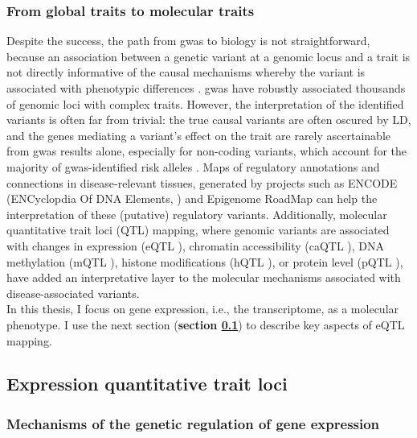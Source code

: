 \subsubsection{From global traits to molecular traits}

Despite the success, the path from \gls{gwas} to biology is not straightforward, because an association between a genetic variant at a genomic locus and a trait is not directly informative of the causal mechanisms whereby the variant is associated with phenotypic differences \cite{visscher201710}. 
\gls{gwas} have robustly associated thousands of genomic loci with complex traits. 
However, the interpretation of the identified variants is often far from trivial: the true causal variants are often oscured by LD, and the genes mediating a variant's effect on the trait are rarely ascertainable from \gls{gwas} results alone, especially for non-coding variants, which account for the majority of \gls{gwas}-identified risk alleles \cite{manolio2009finding, gallagher2018post, wainberg2019opportunities}. 
Maps of regulatory annotations and connections in disease-relevant tissues, generated by projects such as ENCODE (ENCyclopdia Of DNA Elements, \cite{encode2004encode}) and Epigenome RoadMap \cite{kundaje2015integrative} can help the interpretation of these (putative) regulatory variants.
Additionally, molecular quantitative trait loci (QTL) mapping, where genomic variants are associated with changes in expression (eQTL \cite{schadt2003genetics}), chromatin accessibility (caQTL \cite{degner2012dnase}), DNA methylation (mQTL \cite{gaunt2016systematic}), histone modifications (hQTL \cite{grubert2015genetic}), or  protein level (pQTL \cite{melzer2008genome}), have added an interpretative layer to the molecular mechanisms associated with disease-associated variants. \\

In this thesis, I focus on gene expression, i.e., the transcriptome, as a molecular phenotype.
I use the next section (\textbf{section \ref{sec:eqtl}}) to describe key aspects of eQTL mapping.

\subsection{Expression quantitative trait loci}
\label{sec:eqtl}

\subsubsection{Mechanisms of the genetic regulation of gene expression}

